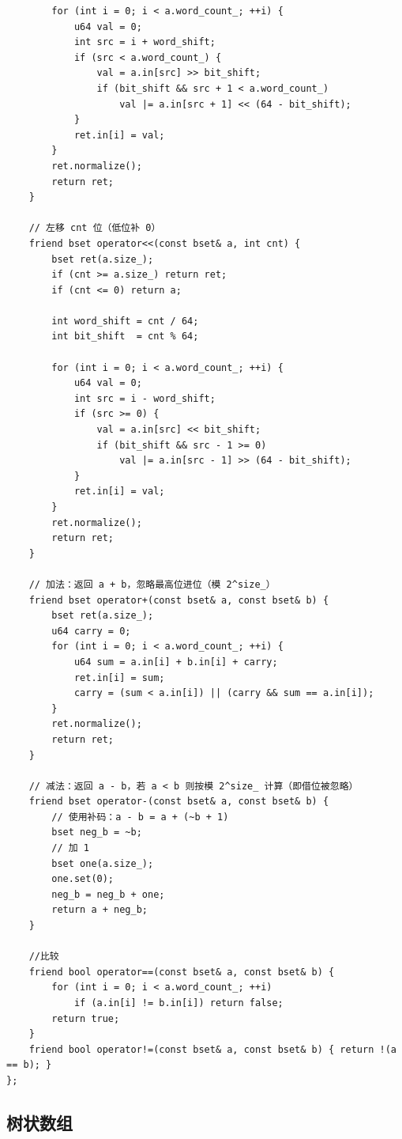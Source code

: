 \begin{lstlisting}
        for (int i = 0; i < a.word_count_; ++i) {
            u64 val = 0;
            int src = i + word_shift;
            if (src < a.word_count_) {
                val = a.in[src] >> bit_shift;
                if (bit_shift && src + 1 < a.word_count_)
                    val |= a.in[src + 1] << (64 - bit_shift);
            }
            ret.in[i] = val;
        }
        ret.normalize();
        return ret;
    }

    // 左移 cnt 位（低位补 0）
    friend bset operator<<(const bset& a, int cnt) {
        bset ret(a.size_);
        if (cnt >= a.size_) return ret;
        if (cnt <= 0) return a;

        int word_shift = cnt / 64;
        int bit_shift  = cnt % 64;

        for (int i = 0; i < a.word_count_; ++i) {
            u64 val = 0;
            int src = i - word_shift;
            if (src >= 0) {
                val = a.in[src] << bit_shift;
                if (bit_shift && src - 1 >= 0)
                    val |= a.in[src - 1] >> (64 - bit_shift);
            }
            ret.in[i] = val;
        }
        ret.normalize();
        return ret;
    }

    // 加法：返回 a + b，忽略最高位进位（模 2^size_）
    friend bset operator+(const bset& a, const bset& b) {
        bset ret(a.size_);
        u64 carry = 0;
        for (int i = 0; i < a.word_count_; ++i) {
            u64 sum = a.in[i] + b.in[i] + carry;
            ret.in[i] = sum;
            carry = (sum < a.in[i]) || (carry && sum == a.in[i]); 
        }
        ret.normalize();
        return ret;
    }

    // 减法：返回 a - b，若 a < b 则按模 2^size_ 计算（即借位被忽略）
    friend bset operator-(const bset& a, const bset& b) {
        // 使用补码：a - b = a + (~b + 1)
        bset neg_b = ~b;
        // 加 1
        bset one(a.size_);
        one.set(0);
        neg_b = neg_b + one;
        return a + neg_b;
    }

    //比较
    friend bool operator==(const bset& a, const bset& b) {
        for (int i = 0; i < a.word_count_; ++i)
            if (a.in[i] != b.in[i]) return false;
        return true;
    }
    friend bool operator!=(const bset& a, const bset& b) { return !(a == b); }
};
\end{lstlisting}

\subsection{树状数组}

